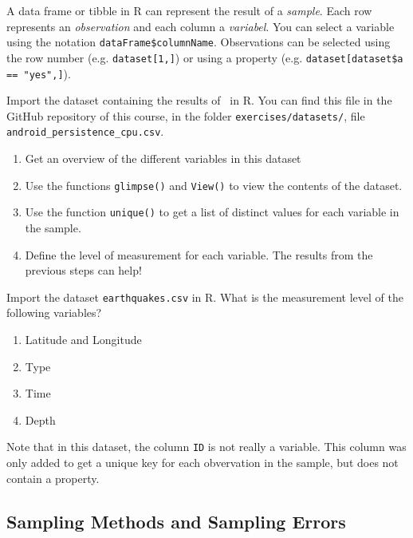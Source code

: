 A data frame or tibble in R can represent the result of a \textit{sample}.
Each row represents an \textit{observation} and each column a \textit{variabel}. 
You can select a variable using the notation \texttt{dataFrame\$columnName}. 
Observations can be selected using the row number (e.g. \texttt{dataset[1,]}) or using a property (e.g. \verb|dataset[dataset$a == "yes",]|).

\begin{exercise}
    Import the dataset containing the results of~\textcite{Akin2016} in R. 
    You can find this file in the GitHub repository of this course, in the folder
    \texttt{exercises/datasets/}, 
    file \texttt{android\_persistence\_cpu.csv}.
    
    \begin{enumerate}
        \item Get an overview of the different variables in this dataset
        \item Use the functions \texttt{glimpse()} and \texttt{View()} to view the contents of the dataset.
        \item Use the function \texttt{unique()} to get a list of distinct values for each variable in the sample.
        \item Define the level of measurement for each variable. The results from the previous steps can help!
      \end{enumerate}
\end{exercise}

\begin{exercise}
  Import the dataset \texttt{earthquakes.csv} in R.
  What is the measurement level of the following variables?
  
  \begin{enumerate}
    \item Latitude and Longitude
    \item Type
    \item Time
    \item Depth
  \end{enumerate}

  Note that in this dataset, the column \texttt{ID} is not really a variable. 
  This column was only added to get a unique key for each obvervation in the sample, but does not contain a property.
\end{exercise}

\subsection{Sampling Methods and Sampling Errors}


